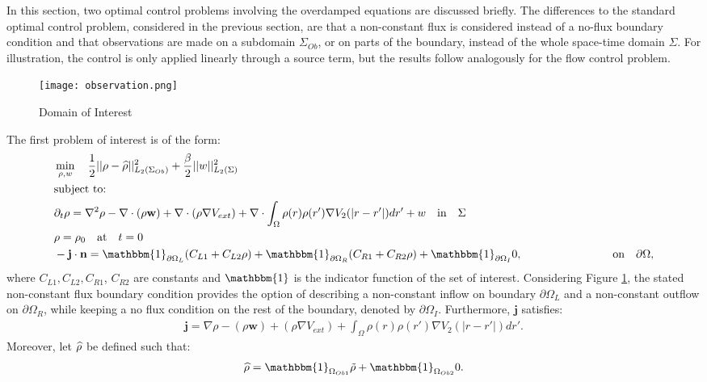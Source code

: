 

In this section, two optimal control problems involving the overdamped equations are discussed briefly. The differences to the standard optimal control problem, considered in the previous section, are that a non-constant flux is considered instead of a no-flux boundary condition and that observations are made on a subdomain $\Sigma_{Ob}$, or on parts of the boundary, instead of the whole space-time domain $\Sigma$. For illustration, the control is only applied linearly through a source term, but the results follow analogously for the flow control problem. 
\begin{figure}[h]
	\texttt{[image: observation.png]}
	\caption{Domain of Interest}
	\label{Observation1}
\end{figure}
The first problem of interest is of the form:
\begin{align*}
&\min_{\Sta, w} \quad \frac{1}{2}|| \Sta -\widehat \Sta||^2_{L_2( \Sigma_{Ob})} + \frac{\beta}{2}||w||^2_{L_2(\Sigma)}\\
&\text{subject to:}\\
&\partial_t \rho = \nabla^2 \rho - \nabla \cdot (\rho \mathbf{w}) +\nabla \cdot (\rho \nabla V_{ext}) + \nabla \cdot \int_\Omega \rho(r) \rho(r') \nabla V_2(|r-r'|) dr' + w \quad  \text{in} \quad \Sigma\notag\\
& \rho = \rho_0 \quad \text{at} \quad t=0 \notag\\
& - \mathbf{j} \cdot \nor = \mathbbm{1}_{\partial \Omega_L}( C_{L1}  + C_{L2}\Sta) +\mathbbm{1}_{\partial \Omega_R} ( C_{R1}  + C_{R2}\Sta) +\mathbbm{1}_{\partial \Omega_I} 0,\quad \quad\qquad\qquad  \qquad \text{on} \quad \partial \Omega, 
\end{align*}
where $C_{L1}, C_{L2}, C_{R1}$, $C_{R2}$ are constants and $\mathbbm{1}$ is the indicator function of the set of interest. Considering Figure \ref{Observation1}, the stated non-constant flux boundary condition provides the option of describing a non-constant inflow on boundary $\partial \Omega_L$ and a non-constant outflow on $\partial \Omega_R$, while keeping a no flux condition on the rest of the boundary, denoted by $\partial \Omega_I$.
Furthermore, $\mathbf{j}$ satisfies:
\begin{align*}
\mathbf{j}=\nabla \rho - (\rho \mathbf{w}) +(\rho \nabla V_{ext}) +  \int_\Omega \rho(r) \rho(r') \nabla V_2(|r-r'|) dr'.
\end{align*}
Moreover, let $\widehat {\rho}$ be defined such that:
\begin{align*}
\widehat \Sta = \mathbbm{1}_{ \Omega_{Ob1}} \tilde \Sta  +\mathbbm{1}_{ \Omega_{Ob2}} 0.
\end{align*}
